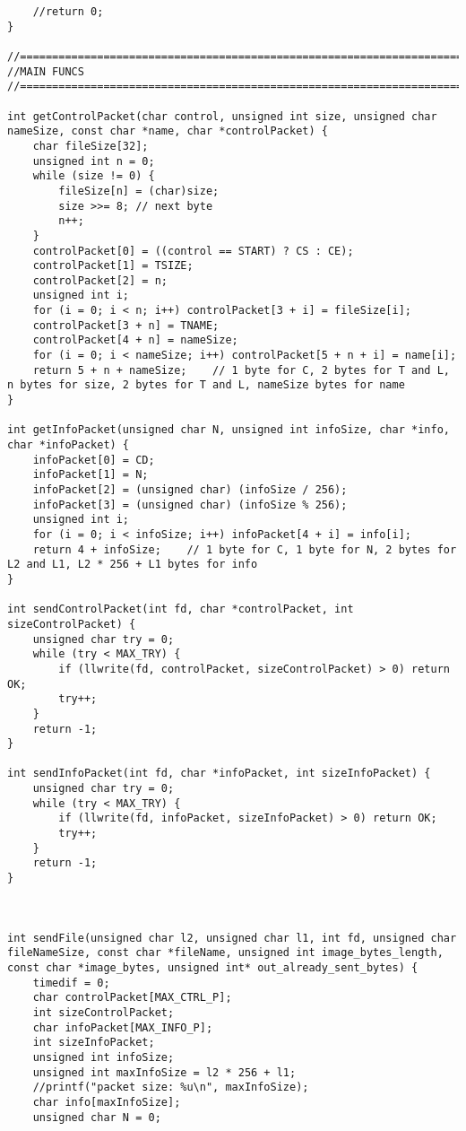\begin{lstlisting}
	//return 0;
}

//================================================================================================================
//MAIN FUNCS
//================================================================================================================

int getControlPacket(char control, unsigned int size, unsigned char nameSize, const char *name, char *controlPacket) {
	char fileSize[32];
	unsigned int n = 0;
	while (size != 0) {
		fileSize[n] = (char)size;
		size >>= 8; // next byte
		n++;
	}
	controlPacket[0] = ((control == START) ? CS : CE);
	controlPacket[1] = TSIZE;
	controlPacket[2] = n;
	unsigned int i;
	for (i = 0; i < n; i++) controlPacket[3 + i] = fileSize[i];
	controlPacket[3 + n] = TNAME;
	controlPacket[4 + n] = nameSize;
	for (i = 0; i < nameSize; i++) controlPacket[5 + n + i] = name[i];
	return 5 + n + nameSize; 	// 1 byte for C, 2 bytes for T and L, n bytes for size, 2 bytes for T and L, nameSize bytes for name
}

int getInfoPacket(unsigned char N, unsigned int infoSize, char *info, char *infoPacket) {
	infoPacket[0] = CD;
	infoPacket[1] = N;
	infoPacket[2] = (unsigned char) (infoSize / 256);
	infoPacket[3] = (unsigned char) (infoSize % 256);
	unsigned int i;
	for (i = 0; i < infoSize; i++) infoPacket[4 + i] = info[i];
	return 4 + infoSize;	// 1 byte for C, 1 byte for N, 2 bytes for L2 and L1, L2 * 256 + L1 bytes for info
}

int sendControlPacket(int fd, char *controlPacket, int sizeControlPacket) {
	unsigned char try = 0;
	while (try < MAX_TRY) {
		if (llwrite(fd, controlPacket, sizeControlPacket) > 0) return OK;
		try++;
	}
	return -1;
}

int sendInfoPacket(int fd, char *infoPacket, int sizeInfoPacket) {
	unsigned char try = 0;
	while (try < MAX_TRY) {
		if (llwrite(fd, infoPacket, sizeInfoPacket) > 0) return OK;
		try++;
	}
	return -1;
}



int sendFile(unsigned char l2, unsigned char l1, int fd, unsigned char fileNameSize, const char *fileName, unsigned int image_bytes_length, const char *image_bytes, unsigned int* out_already_sent_bytes) {
	timedif = 0;
	char controlPacket[MAX_CTRL_P];
	int sizeControlPacket;
	char infoPacket[MAX_INFO_P];
	int sizeInfoPacket;
	unsigned int infoSize;
	unsigned int maxInfoSize = l2 * 256 + l1;
	//printf("packet size: %u\n", maxInfoSize);
	char info[maxInfoSize];
	unsigned char N = 0;


\end{lstlisting}
